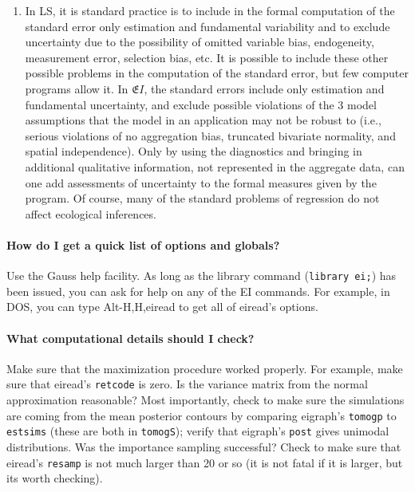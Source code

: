 \documentclass[11pt,titlepage]{article}
\newcommand{\EI}{\ensuremath{{\mathfrak EI}}}
\begin{document}
\begin{enumerate}
\item In LS, it is standard practice is to include in the formal
  computation of the standard error only estimation and fundamental
  variability and to exclude uncertainty due to the possibility of
  omitted variable bias, endogeneity, measurement error, selection
  bias, etc.  It is possible to include these other possible problems
  in the computation of the standard error, but few computer programs
  allow it.  In \EI, the standard errors include only estimation and
  fundamental uncertainty, and exclude possible violations of the 3
  model assumptions that the model in an application may not be robust
  to (i.e., serious violations of no aggregation bias, truncated
  bivariate normality, and spatial independence).  Only by using the
  diagnostics and bringing in additional qualitative information, not
  represented in the aggregate data, can one add assessments of
  uncertainty to the formal measures given by the program.  Of course,
  many of the standard problems of regression do not affect ecological
  inferences.
\end{enumerate}

\paragraph{How do I get a quick list of options and globals?}  Use the
Gauss help facility.  As long as the library command (\texttt{library
  ei;}) has been issued, you can ask for help on any of the
EI commands.  For example, in DOS, you can type Alt-H,H,eiread to get
all of eiread's options.

\paragraph{What computational details should I check?}
Make sure that the maximization procedure worked properly.  For
example, make sure that eiread's \texttt{retcode} is zero.  Is the
variance matrix from the normal approximation reasonable?  Most
importantly, check to make sure the simulations are coming from the
mean posterior contours by comparing eigraph's \texttt{tomogp} to
\texttt{estsims} (these are both in \texttt{tomogS}); verify that
eigraph's \texttt{post} gives unimodal distributions.  Was the
importance sampling successful?  Check to make sure that eiread's
\texttt{resamp} is not much larger than 20 or so (it is not fatal if
it is larger, but its worth checking).
\end{document}
